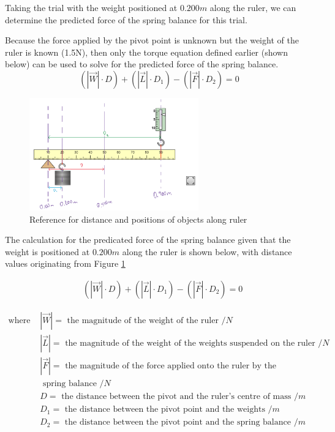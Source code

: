 \documentclass[letterpaper, 12pt]{article}
\begin{document}
Taking the trial with the weight positioned at $0.200\unit{m}$ along the ruler,
we can determine the predicted force of the spring balance for this trial.

Because the force applied by the pivot point is unknown but the weight of the ruler is known (1.5\unit{N}),
then only the torque equation defined earlier (shown below) can be used to solve for
the predicted force of the spring balance.
$$
    \left(\left|\vec{W}\right|\cdot D\right) + \left(\left|\vec{L}\right|\cdot D_1\right) - \left(\left|\vec{F}\right|\cdot D_2\right) = 0
$$

\begin{figure}[H]
    \centering
    \includegraphics[width=0.65\textwidth]{distanceref}
    \caption{Reference for distance and positions of objects along ruler}
    \label{fig:distRef}
\end{figure}

The calculation for the predicated force of the spring balance given that
the weight is positioned at $0.200\unit{m}$ along the ruler is shown below,
with distance values originating from Figure \ref*{fig:distRef}

\begin{align*}
     & \left(\left|\vec{W}\right|\cdot D\right) + \left(\left|\vec{L}\right|\cdot D_1\right) - \left(\left|\vec{F}\right|\cdot D_2\right) = 0
\end{align*}

\begin{align*}
    \text{where } & \left|\vec{W}\right| = \text{ the magnitude of the weight of the ruler } /\unit{N}
    \\
                  & \left|\vec{L}\right| = \text{ the magnitude of the weight of the weights suspended on the ruler } /\unit{N}
    \\
                  & \left|\vec{F}\right| = \text{ the magnitude of the force applied onto the ruler by the}
    \\ &\text{ spring balance } /\unit{N}
    \\
                  & D = \text{ the distance between the pivot and the ruler's centre of mass } /\unit{m}
    \\ & D_1 = \text{ the distance between the pivot point and the weights } /\unit{m}
    \\ & D_2 = \text{ the distance between the pivot point and the spring balance } /\unit{m}
\end{align*}
\end{document}
